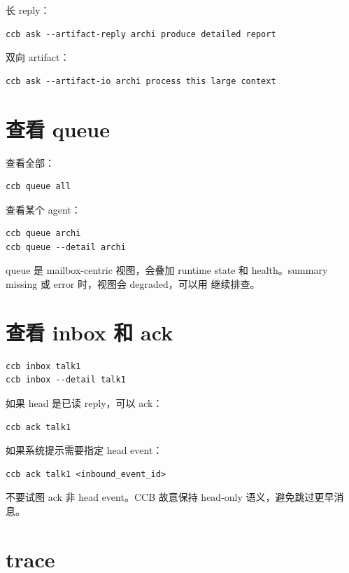 长 reply：

\begin{lstlisting}
ccb ask --artifact-reply archi produce detailed report
\end{lstlisting}

双向 artifact：

\begin{lstlisting}
ccb ask --artifact-io archi process this large context
\end{lstlisting}

\section{查看 queue}

查看全部：

\begin{lstlisting}
ccb queue all
\end{lstlisting}

查看某个 agent：

\begin{lstlisting}
ccb queue archi
ccb queue --detail archi
\end{lstlisting}

queue 是 mailbox-centric 视图，会叠加 runtime state 和 health。summary missing 或 error 时，视图会 degraded，可以用  继续排查。

\section{查看 inbox 和 ack}

\begin{lstlisting}
ccb inbox talk1
ccb inbox --detail talk1
\end{lstlisting}

如果 head 是已读 reply，可以 ack：

\begin{lstlisting}
ccb ack talk1
\end{lstlisting}

如果系统提示需要指定 head event：

\begin{lstlisting}
ccb ack talk1 <inbound_event_id>
\end{lstlisting}

不要试图 ack 非 head event。CCB 故意保持 head-only 语义，避免跳过更早消息。

\section{trace}

